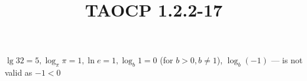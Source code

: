 \documentclass{article}
\title{TAOCP 1.2.2\mbox{-}17}
\begin{document}
\maketitle

\( \lg 32 = 5, \log_\pi{\pi} = 1, \ln{e} = 1, \log_b{1} = 0 \) (for \( b > 0, b \neq 1 \)), \( \log_b{(-1)} \) --- is not valid as \( -1 < 0 \)
\end{document}
